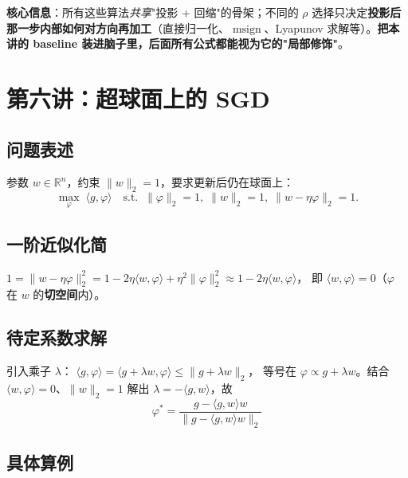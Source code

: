 \documentclass[11pt,a4paper]{article}
\theoremstyle{mythm}
\theoremstyle{mydef}
\newcommand{\R}{\mathbb{R}}
\newcommand{\msign}{\operatorname{msign}}
\newcommand{\inner}[2]{\langle #1, #2 \rangle}
\begin{document}
\textbf{核心信息}：所有这些算法\emph{共享}"投影 + 回缩"的骨架；不同的 $\rho$ 选择只决定\textbf{投影后那一步内部如何对方向再加工}（直接归一化、$\msign$、Lyapunov 求解等）。\textbf{把本讲的 baseline 装进脑子里，后面所有公式都能视为它的"局部修饰"}。

\section{第六讲：超球面上的 SGD}\label{sec:sphere}

\subsection{问题表述}
参数 $w\in\R^n$，约束 $\|w\|_2 = 1$，要求更新后仍在球面上：
\begin{equation}
\max_\varphi\; \inner{g}{\varphi}\quad\text{s.t.}\;\;\|\varphi\|_2 = 1,\;\|w\|_2 = 1,\;\|w-\eta\varphi\|_2 = 1.
\end{equation}

\subsection{一阶近似化简}
$1 = \|w-\eta\varphi\|_2^2 = 1 - 2\eta\inner{w}{\varphi} + \eta^2\|\varphi\|_2^2 \approx 1 - 2\eta\inner{w}{\varphi}$，
即 $\inner{w}{\varphi} = 0$（$\varphi$ 在 $w$ 的\textbf{切空间}内）。

\subsection{待定系数求解}
引入乘子 $\lambda$：
$\inner{g}{\varphi} = \inner{g+\lambda w}{\varphi} \le \|g+\lambda w\|_2$，
等号在 $\varphi \propto g + \lambda w$。结合 $\inner{w}{\varphi}=0$、$\|w\|_2=1$ 解出 $\lambda = -\inner{g}{w}$，故
\begin{equation}\label{eq:sphere-sgd}
\boxed{\quad\varphi^\ast = \frac{g - \inner{g}{w}w}{\|g-\inner{g}{w}w\|_2}\quad}
\end{equation}

\subsection{具体算例}
\end{document}

